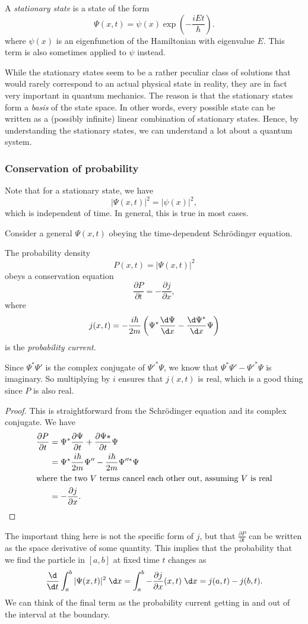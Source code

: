 \documentclass[a4paper]{article}
\begin{document}
\begin{defi}
  A \emph{stationary state} is a state of the form
  \[
    \Psi(x, t) = \psi(x) \exp\left(-\frac{iEt}{\hbar}\right).
  \]
  where $\psi(x)$ is an eigenfunction of the Hamiltonian with eigenvalue $E$. This term is also sometimes applied to $\psi$ instead.
\end{defi}
While the stationary states seem to be a rather peculiar class of solutions that would rarely correspond to an actual physical state in reality, they are in fact very important in quantum mechanics. The reason is that the stationary states form a \emph{basis} of the state space. In other words, every possible state can be written as a (possibly infinite) linear combination of stationary states. Hence, by understanding the stationary states, we can understand a lot about a quantum system.

\subsubsection*{Conservation of probability}
Note that for a stationary state, we have
\[
  |\Psi(x, t)|^2 = |\psi(x)|^2,
\]
which is independent of time. In general, this is true in most cases.

Consider a general $\Psi(x, t)$ obeying the time-dependent Schr\"odinger equation.

\begin{prop}
  The probability density
  \[
    P(x, t) = |\Psi(x, t)|^2
  \]
  obeys a conservation equation
  \[
    \frac{\partial P}{\partial t} = - \frac{\partial j}{\partial x},
  \]
  where
  \[
    j(x, t) = -\frac{i\hbar}{2m} \left(\Psi^*\frac{\d \Psi}{\d x} - \frac{\d \Psi^*}{\d x} \Psi\right)
  \]
  is the \emph{probability current}.
\end{prop}
Since $\Psi^* \Psi'$ is the complex conjugate of $\Psi'^* \Psi$, we know that $\Psi^*\Psi' - \Psi'^* \Psi$ is imaginary. So multiplying by $i$ ensures that $j(x, t)$ is real, which is a good thing since $P$ is also real.

\begin{proof}
  This is straightforward from the Schr\"odinger equation and its complex conjugate. We have
  \begin{align*}
    \frac{\partial P}{\partial t} &= \Psi^* \frac{\partial \Psi}{\partial t} + \frac{\partial \Psi*}{\partial t} \Psi\\
    &= \Psi^* \frac{i\hbar }{2m}\Psi'' - \frac{i\hbar}{2m}\Psi''^* \Psi\\
    \intertext{where the two $V$ terms cancel each other out, assuming $V$ is real}
    &= -\frac{\partial j}{\partial x}.
  \end{align*}
\end{proof}
The important thing here is not the specific form of $j$, but that $\frac{\partial P}{\partial t}$ can be written as the space derivative of some quantity. This implies that the probability that we find the particle in $[a, b]$ at fixed time $t$ changes as
\[
  \frac{\d}{\d t}\int_a^b |\Psi(x, t)|^2 \;\d x = \int_a^b -\frac{\partial j}{\partial x}(x, t)\;\d x = j(a, t) - j(b, t).
\]
We can think of the final term as the probability current getting in and out of the interval at the boundary.
\end{document}
